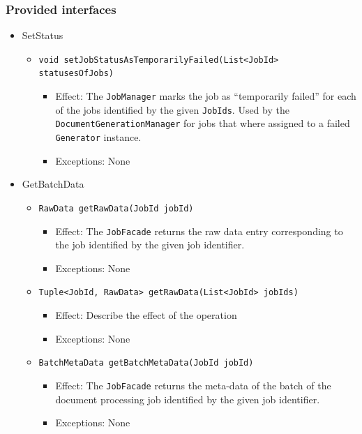 \documentclass[a4paper,10pt]{article}
\begin{document}
\subsubsection*{Provided interfaces}
\begin{itemize}
    \item SetStatus
    \begin{itemize}
        \item \texttt{void setJobStatusAsTemporarilyFailed(List<JobId> statusesOfJobs)}
        \begin{itemize}
            \item Effect: The \texttt{JobManager} marks the job as ``temporarily failed'' for each of the jobs identified by the given \texttt{JobIds}. Used by the \texttt{DocumentGenerationManager} for jobs that where assigned to a failed \texttt{Generator} instance.
            \item Exceptions: None
        \end{itemize}
    \end{itemize}
    
	\item GetBatchData
    \begin{itemize}
        \item \texttt{RawData getRawData(JobId jobId)}
        \begin{itemize}
            \item Effect: The \texttt{JobFacade} returns the raw data entry corresponding to the job identified by the given job identifier.
            \item Exceptions: None
        \end{itemize}
        
        
        
        \item \texttt{Tuple<JobId, RawData> getRawData(List<JobId> jobIds)}
        \begin{itemize}
            \item Effect: Describe the effect of the operation
            \item Exceptions: None
        \end{itemize}
        \item \texttt{BatchMetaData getBatchMetaData(JobId jobId)}
        \begin{itemize}
            \item Effect: The \texttt{JobFacade} returns the meta-data of the batch of the document processing job identified by the given job identifier.
            \item Exceptions: None
        \end{itemize}
    \end{itemize}  
    

\end{itemize}
\end{document}
